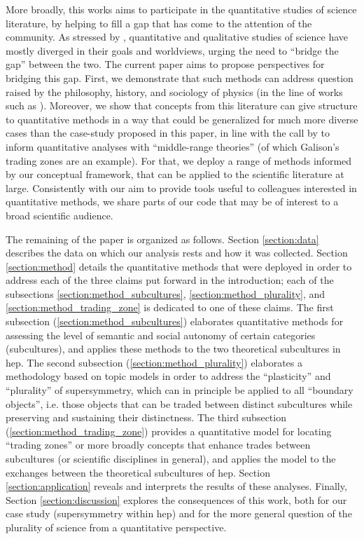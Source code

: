 \documentclass[smallextended]{svjour3}
\begin{document}
More broadly, this works aims to participate in the quantitative studies of science literature, by helping to fill a gap that has come to the attention of the community.  As stressed by \citet{Kang2020,Leydesdorff2020,Bowker2020}, quantitative and qualitative studies of science have mostly diverged in their goals and worldviews, urging the need to ``bridge the gap'' between the two. The current paper aims to propose perspectives for bridging this gap. First, we demonstrate that such methods can address question raised by the philosophy, history, and sociology of physics (in the line of works such as \citealt{Lalli2019a}). Moreover, we show that concepts from this literature can give structure to quantitative methods in a way that could be generalized for much more diverse cases than the case-study proposed in this paper, in line with the call by \citealt{Heinze2020} to inform quantitative analyses with ``middle-range theories'' (of which Galison's trading zones are an example). For that, we deploy a range of methods informed by our conceptual framework, that can be applied to the scientific literature at large. Consistently with our aim to provide tools useful to colleagues interested in quantitative methods, we share parts of our code that may be of interest to a broad scientific audience.

The remaining of the paper is organized as follows. Section \ref{section:data} describes the data on which our analysis rests and how it was collected. Section \ref{section:method} details the quantitative methods that were deployed in order to address each of the three claims put forward in the introduction; each of the subsections \ref{section:method_subcultures}, \ref{section:method_plurality}, and \ref{section:method_trading_zone} is dedicated to one of these claims. The first subsection (\ref{section:method_subcultures}) elaborates quantitative methods for assessing the level of semantic and social autonomy of certain categories (subcultures), and applies these methods to the two theoretical subcultures in \gls{hep}. The second subsection (\ref{section:method_plurality}) elaborates a methodology based on topic models in order to address the ``plasticity'' and ``plurality'' of supersymmetry, which can in principle be applied to all ``boundary objects'', i.e. those objects that can be traded between distinct subcultures while preserving and sustaining their distinctness. The third subsection (\ref{section:method_trading_zone}) provides a quantitative model for locating ``trading zones'' or more broadly concepts that enhance trades between subcultures (or scientific disciplines in general), and applies the model to the exchanges between the theoretical subcultures of \gls{hep}. Section \ref{section:application} reveals and interprets the results of these analyses. Finally, Section \ref{section:discussion} explores the consequences of this work, both for our case study (supersymmetry within \gls{hep}) and for the more general question of the plurality of science from a quantitative perspective.
\end{document}
